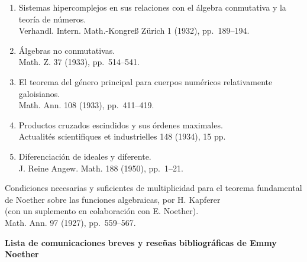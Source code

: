 \begin{enumerate}
\item[39.] Sistemas hipercomplejos en sus relaciones con el álgebra conmutativa y la teoría de números.\\ Verhandl. Intern. Math.-Kongreß Zürich 1 (1932), pp.~189--194.
\item[40.] Álgebras no conmutativas.\\ Math. Z. 37 (1933), pp.~514--541.
\item[41.] El teorema del género principal para cuerpos numéricos relativamente galoisianos.\\ Math. Ann. 108 (1933), pp.~411--419.
\item[42.] Productos cruzados escindidos y sus órdenes maximales.\\ Actualités scientifiques et industrielles 148 (1934), 15 pp.
\item[43.] Diferenciación de ideales y diferente.\\ J. Reine Angew. Math. 188 (1950), pp.~1--21.
\end{enumerate}

\noindent Condiciones necesarias y suficientes de multiplicidad para el teorema fundamental de Noether sobre las funciones algebraicas, por H. Kapferer\\
(con un suplemento en colaboración con E. Noether).\\
Math. Ann. 97 (1927), pp.~559--567.

\clearpage
\begin{center}{\Large\bfseries Lista de comunicaciones breves y reseñas bibliográficas de Emmy Noether}\end{center}
\label{liste-der-kurzmitteilungen-und-buchbesprechungen-von-emmy-noether}

